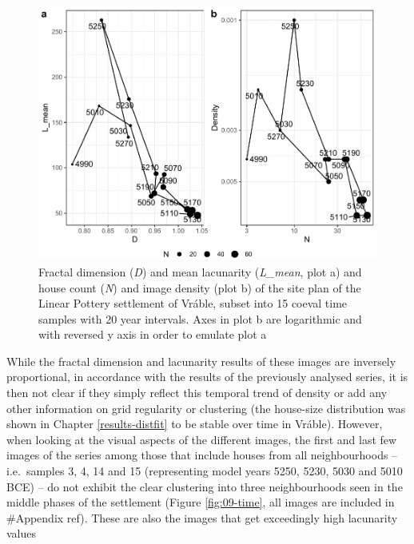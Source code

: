 \documentclass[
  12pt,
  a4paper, twoside]{book}
\begin{document}
\begin{figure}

{\centering \includegraphics[width=0.9\linewidth]{bookdown-demo_files/figure-latex/09-time-points-1} 

}

\caption[D and L\_mean, N and density of temporal sample images of Vráble]{Fractal dimension (\emph{D}) and mean lacunarity (\emph{L\_mean}, plot a) and house count (\emph{N}) and image density (plot b) of the site plan of the Linear Pottery settlement of Vráble, subset into 15 coeval time samples with 20 year intervals. Axes in plot b are logarithmic and with reversed y axis in order to emulate plot a}\label{fig:09-time-points}
\end{figure}

While the fractal dimension and lacunarity results of these images are inversely proportional, in accordance with the results of the previously analysed series, it is then not clear if they simply reflect this temporal trend of density or add any other information on grid regularity or clustering (the house-size distribution was shown in Chapter \ref{results-distfit} to be stable over time in Vráble). However, when looking at the visual aspects of the different images, the first and last few images of the series among those that include houses from all neighbourhoods -- i.e.~samples 3, 4, 14 and 15 (representing model years 5250, 5230, 5030 and 5010 BCE) -- do not exhibit the clear clustering into three neighbourhoods seen in the middle phases of the settlement (Figure \ref{fig:09-time}, all images are included in \#Appendix ref). These are also the images that get exceedingly high lacunarity values
\end{document}
